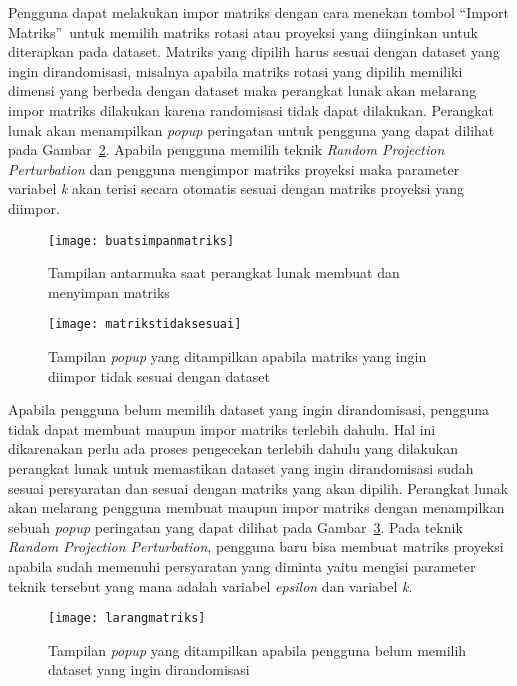 Pengguna dapat melakukan impor matriks dengan cara menekan tombol \textquotedblleft Import Matriks\textquotedblright~untuk memilih matriks rotasi atau proyeksi yang diinginkan untuk diterapkan pada dataset. Matriks yang dipilih harus sesuai dengan dataset yang ingin dirandomisasi, misalnya apabila matriks rotasi yang dipilih memiliki dimensi yang berbeda dengan dataset maka perangkat lunak akan melarang impor matriks dilakukan karena randomisasi tidak dapat dilakukan. Perangkat lunak akan menampilkan \textit{popup} peringatan untuk pengguna yang dapat dilihat pada Gambar~\ref{fig:matrikstidaksesuai}. Apabila pengguna memilih teknik \textit{Random Projection Perturbation} dan pengguna mengimpor matriks proyeksi maka parameter variabel \textit{k} akan terisi secara otomatis sesuai dengan matriks proyeksi yang diimpor.

\begin{figure}
	\centering
	\texttt{[image: buatsimpanmatriks]}
	\caption{Tampilan antarmuka saat perangkat lunak membuat dan menyimpan matriks}
	\label{fig:buatsimpanmatriks}
\end{figure}

\begin{figure}
	\centering
	\texttt{[image: matrikstidaksesuai]}
	\caption{Tampilan \textit{popup} yang ditampilkan apabila matriks yang ingin diimpor tidak sesuai dengan dataset}
	\label{fig:matrikstidaksesuai}
\end{figure}

Apabila pengguna belum memilih dataset yang ingin dirandomisasi, pengguna tidak dapat membuat maupun impor matriks terlebih dahulu. Hal ini dikarenakan perlu ada proses pengecekan terlebih dahulu yang dilakukan perangkat lunak untuk memastikan dataset yang ingin dirandomisasi sudah sesuai persyaratan dan sesuai dengan matriks yang akan dipilih. Perangkat lunak akan melarang pengguna membuat maupun impor matriks dengan menampilkan sebuah \textit{popup} peringatan yang dapat dilihat pada Gambar~\ref{fig:larangmatriks}. Pada teknik \textit{Random Projection Perturbation}, pengguna baru bisa membuat matriks proyeksi apabila sudah memenuhi persyaratan yang diminta yaitu mengisi parameter teknik tersebut yang mana adalah variabel \textit{epsilon} dan variabel \textit{k}.

\begin{figure}
	\centering
	\texttt{[image: larangmatriks]}
	\caption{Tampilan \textit{popup} yang ditampilkan apabila pengguna belum memilih dataset yang ingin dirandomisasi}
	\label{fig:larangmatriks}
\end{figure}

